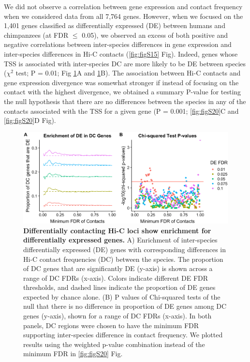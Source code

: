 We did not observe a correlation between gene expression and contact frequency when we considered data from all 7,764 genes. However, when we focused on the 1,401 genes classified as differentially expressed (DE) between humans and chimpanzees (at FDR ${\leq}$ 0.05), we observed an excess of both positive and negative correlations between inter-species differences in gene expression and inter-species differences in Hi-C contacts (\ref{fig:figS15} Fig). Indeed, genes whose TSS is associated with inter-species DC are more likely to be DE between species ($\chi^2$ test; P = 0.01; Fig \ref{fig:fig6}A and \ref{fig:fig6}B). The association between Hi-C contacts and gene expression divergence was somewhat stronger if instead of focusing on the contact with the highest divergence, we obtained a summary P-value \cite{Whitlock.2005} for testing the null hypothesis that there are no differences between the species in any of the contacts associated with the TSS for a given gene (P = 0.001; \ref{fig:figS20}C and \ref{fig:figS20}D Fig).

\begin{figure}
\centering
\includegraphics[width=6in]{img/fig6.PNG}
\caption[Differentially contacting Hi-C loci show enrichment for differentially expressed genes.]{\textbf{Differentially contacting Hi-C loci show enrichment for differentially expressed genes.} A) Enrichment of inter-species differentially expressed (DE) genes with corresponding differences in Hi-C contact frequencies (DC) between the species. The proportion of DC genes that are significantly DE (y-axis) is shown across a range of DC FDRs (x-axis). Colors indicate different DE FDR thresholds, and dashed lines indicate the proportion of DE genes expected by chance alone. (B) P values of Chi-squared tests of the null that there is no difference in proportion of DE genes among DC genes (y-axis), shown for a range of DC FDRs (x-axis). In both panels, DC regions were chosen to have the minimum FDR supporting inter-species difference in contact frequency. We plotted results using the weighted p-value combination instead of the minimum FDR in \ref{fig:figS20} Fig.}
\label{fig:fig6}
\end{figure}

